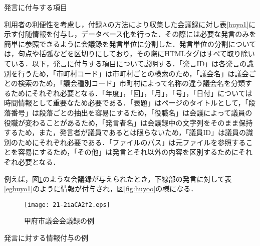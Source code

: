 \documentclass[japanese]{jnlp_1.4}
\begin{document}
\begin{table}[b]
\caption{発言に付与する項目}
\label{huyo1}

\end{table}

利用者の利便性を考慮し，付録Aの方法により収集した会議録に対し表\ref{huyo1}に示す付随情報を付与し，データベース化を行った．その際には必要な発言のみを簡単に参照できるように会議録を発言単位に分割した．発言単位の分割については，句点や括弧などを区切りにしており，その際にHTMLタグはすべて取り除いている．以下，発言に付与する項目について説明する．「発言ID」は各発言の識別を行うため，「市町村コード」は市町村ごとの検索のため，「議会名」は議会ごとの検索のため，「議会種別コード」市町村によって名称の違う議会名を分類するためにそれぞれ必要となる．「年度」，「回」，「月」，「号」，「日付」については時間情報として重要なため必要である．「表題」はページのタイトルとして，「段落番号」は段落ごとの抽出を容易にするため，「役職名」は会議によって議員の役職が変わることがあるため，「発言者名」は会議録中の文字列をそのまま保持するため，また，発言者が議員であるとは限らないため，「議員ID」は議員の識別のためにそれぞれ必要である．「ファイルのパス」は元ファイルを参照することを容易にするため，「その他」は発言とそれ以外の内容を区別するためにそれぞれ必要となる．

例えば，図\ref{egko}のような会議録が与えられたとき，下線部の発言に対して表\ref{eghuyo1}のように情報が付与され，図\ref{fig:huyoo}の様になる．

\begin{figure}[t]
 \begin{center}
 \texttt{[image: 21-2iaCA2f2.eps]}
 \end{center}
 \caption{甲府市議会会議録の例}
 \label{egko}
\end{figure}

\begin{table}[t]
\caption{発言に対する情報付与の例}
\label{eghuyo1}

\end{table}
\end{document}
